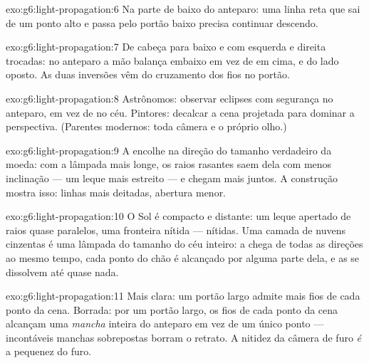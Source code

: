 \begin{solution}{exo:g6:light-propagation:6}
Na parte de baixo do anteparo: uma linha reta que sai de um ponto
alto e passa pelo portão baixo precisa continuar descendo.
\end{solution}

\begin{solution}{exo:g6:light-propagation:7}
De cabeça para baixo e com esquerda e direita trocadas: no anteparo a
mão balança embaixo em vez de em cima, e do lado oposto. As duas
inversões vêm do cruzamento dos fios no portão.
\end{solution}

\begin{solution}{exo:g6:light-propagation:8}
Astrônomos: observar eclipses com segurança no anteparo, em vez de no
céu. Pintores: decalcar a cena projetada para dominar a perspectiva.
(Parentes modernos: toda câmera e o próprio olho.)
\end{solution}

\begin{solution}{exo:g6:light-propagation:9}
A  encolhe na direção do tamanho verdadeiro da moeda: com a
lâmpada mais longe, os raios rasantes saem dela com menos inclinação
--- um leque mais estreito --- e chegam mais juntos. A construção
mostra isso: linhas mais deitadas, abertura menor.
\end{solution}

\begin{solution}{exo:g6:light-propagation:10}
O Sol é compacto e distante: um leque apertado de raios quase
paralelos, uma fronteira nítida ---  nítidas. Uma camada de
nuvens cinzentas é uma lâmpada do tamanho do céu inteiro: a  chega
de todas as direções ao mesmo tempo, cada ponto do chão é alcançado
por alguma parte dela, e as  se dissolvem até quase nada.
\end{solution}

\begin{solution}{exo:g6:light-propagation:11}
Mais clara: um portão largo admite mais fios de cada ponto da cena.
Borrada: por um portão largo, os fios de cada ponto da cena alcançam
uma \emph{mancha} inteira do anteparo em vez de um único ponto ---
incontáveis manchas sobrepostas borram o retrato. A nitidez da câmera
de furo \emph{é} a pequenez do furo.
\end{solution}


